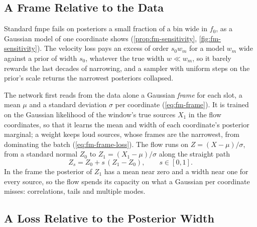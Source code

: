 \subsection{A Frame Relative to the Data}
\label{sec:method-frame}

Standard \ac{fmpe} fails on posteriors a small fraction of a bin wide in $f_0$, as a Gaussian model
of one coordinate shows (\cref{prop:fm-sensitivity}, \cref{fig:fm-sensitivity}). The velocity loss
pays an excess of order $s_0 w_m$ for a model $w_m$ wide against a prior of width $s_0$, whatever
the true width $w\ll w_m$, so it barely rewards the last decades of narrowing, and a sampler with
uniform steps on the prior's scale returns the narrowest posteriors collapsed.

The network first reads from the data alone a Gaussian \emph{frame} for each slot, a mean $\mu$
and a standard deviation $\sigma$ per coordinate (\cref{eq:fm-frame}). It is trained on the
Gaussian likelihood of the window's true sources $X_1$ in the flow coordinates, so that it learns
the mean and width of each coordinate's posterior marginal; a weight keeps loud sources, whose
frames are the narrowest, from dominating the batch (\cref{eq:fm-frame-loss}). The flow runs on
$Z=(X-\mu)/\sigma$, from a standard normal $Z_0$ to $Z_1=(X_1-\mu)/\sigma$ along the straight path
\begin{equation}
  Z_s = Z_0 + s\,(Z_1 - Z_0),\qquad s\in[0,1].
  \label{eq:fm-path}
\end{equation}
In the frame the posterior of $Z_1$ has a mean near zero and a width near one for every source, so
the flow spends its capacity on what a Gaussian per coordinate misses: correlations, tails and
multiple modes.

\subsection{A Loss Relative to the Posterior Width}
\label{sec:method-fm}


